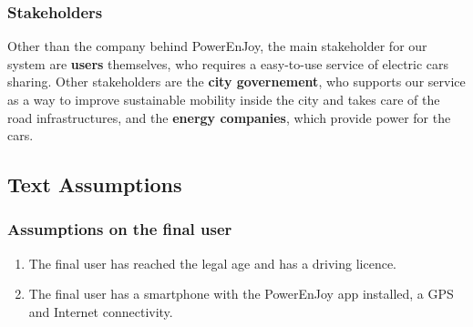 \documentclass[11pt]{article} %
\newcommand{\pe}{PowerEnJoy }
\newcommand{\pecomma}{PowerEnJoy, }
\begin{document}
\subsubsection{Stakeholders}
Other than the company behind \pecomma the main stakeholder for our system are \textbf{users} themselves, who requires a easy-to-use service of electric cars sharing. Other stakeholders are the \textbf{city governement}, who supports our service as a way to improve sustainable mobility inside the city and takes care of the road infrastructures, and the \textbf{energy companies}, which provide power for the cars.

\subsection{Text Assumptions}

\subsubsection{Assumptions on the final user}
\begin{enumerate}
	\item The final user has reached the legal age and has a driving licence.
	\item The final user has a smartphone with the \pe app installed, a GPS and Internet connectivity.
\end{enumerate}
  
\end{document}
